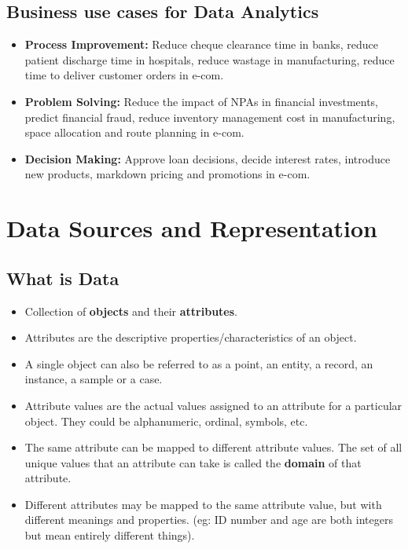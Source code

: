 \documentclass{article}
\theoremstyle{plain}
\theoremstyle{definition}
\begin{document}
\subsection{Business use cases for Data Analytics}
\begin{itemize}
    \item \textbf{Process Improvement:} Reduce cheque clearance time in banks, reduce patient discharge time in hospitals, reduce wastage in manufacturing, reduce time to deliver customer orders in e-com. 
    
    \item \textbf{Problem Solving:} Reduce the impact of NPAs in financial investments, predict financial fraud, reduce inventory management cost in manufacturing, space allocation and route planning in e-com. 
    
    \item \textbf{Decision Making:} Approve loan decisions, decide interest rates, introduce new products, markdown pricing and promotions in e-com.
    
\end{itemize}

\section{Data Sources and Representation}
\subsection{What is Data}
\begin{itemize}
    \item Collection of \textbf{objects} and their \textbf{attributes}.
    
    \item Attributes are the descriptive properties/characteristics of an object. 
    
    \item A single object can also be referred to as a point, an entity, a record, an instance, a sample or a case. 
    
    \item Attribute values are the actual values assigned to an attribute for a particular object. They could be alphanumeric, ordinal, symbols, etc. 
    
    \item The same attribute can be mapped to different attribute values. The set of all unique values that an attribute can take is called the \textbf{domain} of that attribute. 
    
    \item Different attributes may be mapped to the same attribute value, but with different meanings and properties. (eg: ID number and age are both integers but mean entirely different things).
\end{itemize}
\end{document}
